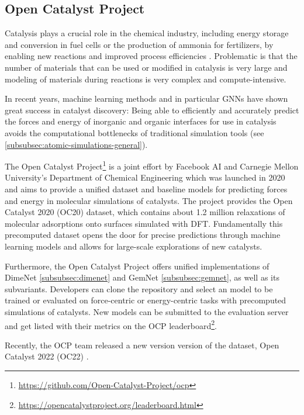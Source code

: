 \subsection{Open Catalyst Project}

Catalysis plays a crucial role in the chemical industry, including energy storage and conversion in 
fuel cells or the production of ammonia for fertilizers, by enabling new reactions and improved 
process efficiencies \cite{Chanussot_2021}. Problematic is that the number of materials that can 
be used or modified in catalysis is very large and modeling of materials during reactions is very 
complex and compute-intensive.

In recent years, machine learning methods and in particular GNNs have shown great success in 
catalyst discovery: Being able to efficiently and accurately predict the 
forces and energy of inorganic and organic interfaces for use in catalysis avoids the 
computational bottlenecks of traditional simulation tools (see \ref{subsubsec:atomic-simulations-general}). 

The Open Catalyst Project\footnote{\url{https://github.com/Open-Catalyst-Project/ocp}} \cite*{Chanussot_2021} 
is a joint effort by Facebook AI and Carnegie Mellon University's Department of Chemical Engineering which was 
launched in 2020 and aims to provide a unified dataset and baseline models for predicting forces and energy in 
molecular simulations of catalysts. The project provides the Open Catalyst 2020 (OC20) dataset, which contains 
about 1.2 million relaxations of molecular adsorptions onto surfaces simulated with DFT. Fundamentally this 
precomputed dataset opens the door for precise predictions through machine learning models and allows
for large-scale explorations of new catalysts.

Furthermore, the Open Catalyst Project offers unified implementations of DimeNet \ref{subsubsec:dimenet} and 
GemNet \ref{subsubsec:gemnet}, as well as its subvariants. Developers can clone the repository and select 
an model to be trained or evaluated on force-centric or energy-centric tasks with precomputed simulations of 
catalysts. New models can be submitted to the evaluation server and get listed with their metrics on the OCP 
leaderboard\footnote{\url{https://opencatalystproject.org/leaderboard.html}}.

Recently, the OCP team released a new version version of the dataset, Open Catalyst 2022 (OC22) 
\cite{https://doi.org/10.48550/arxiv.2206.08917}.
